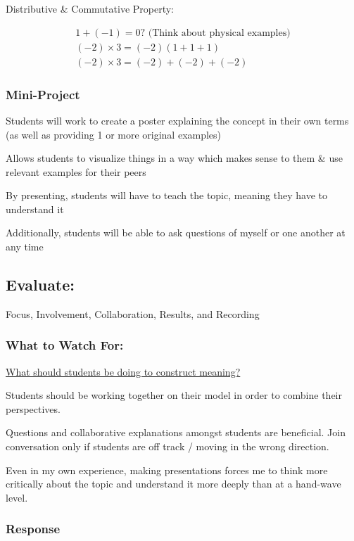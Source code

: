 \documentclass{notes}
\begin{document}
Distributive \& Commutative Property:

\begin{gather}
    1 + (-1) = 0 \mathord{?  \text{  (Think about physical examples)}}\\
    (-2) \times 3 = (-2)(1 + 1 + 1)\\
    (-2) \times 3 = (-2) + (-2) + (-2)
\end{gather}

\subsubsection{Mini-Project}

Students will work to create a poster explaining the concept in their own terms (as well as providing 1 or more original examples)

\tab Allows students to visualize things in a way which makes sense to them \& use relevant examples for their peers

\tab By presenting, students will have to teach the topic, meaning they have to understand it

\tab \indicates Additionally, students will be able to ask questions of myself or one another at any time

\subsection{Evaluate:}

Focus, Involvement, Collaboration, Results, and Recording

\subsubsection{What to Watch For:}

\ul{What should students be doing to construct meaning?}

Students should be working together on their model in order to combine their perspectives.

Questions and collaborative explanations amongst students are beneficial. Join conversation only if students are off track / moving in the wrong direction.

Even in my own experience, making presentations forces me to think more critically about the topic and understand it more deeply than at a hand-wave level.

\subsubsection{Response}
\end{document}
